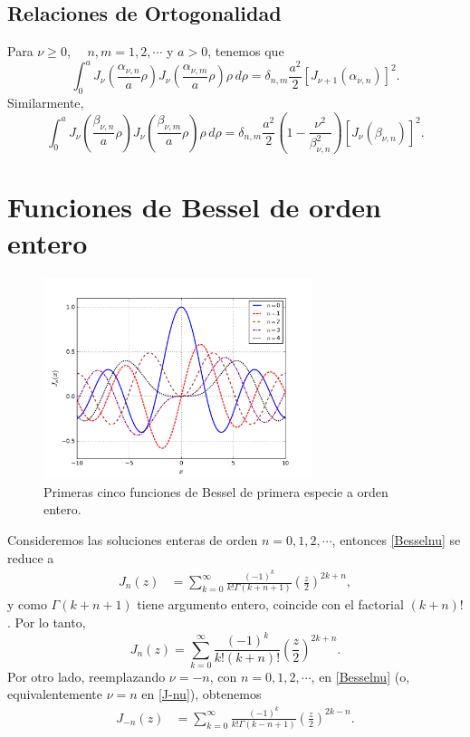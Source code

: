 \subsection{Relaciones de Ortogonalidad}
Para $\nu\ge 0$, $\quad n,m=1,2,\cdots$ y $a>0$, tenemos que
\begin{equation}\label{roJnualpha}
\int_0^a J_\nu\left(\frac{\alpha_{\nu,n}}{a}\rho\right)J_\nu\left(\frac{\alpha_{\nu,m}}{a}\rho\right)\rho \, d\rho=\delta_{n,m}\frac{a^2}{2}\left[J_{\nu+1}(\alpha_{\nu,n})\right]^2.
\end{equation}
Similarmente,
\begin{equation}\label{roJnubeta}
\int_0^a J_\nu\left(\frac{\beta_{\nu,n}}{a}\rho\right)J_\nu\left(\frac{\beta_{\nu,m}}{a}\rho\right)\rho \, d\rho=\delta_{n,m}\frac{a^2}{2}\left(1-\frac{\nu^2}{\beta_{\nu,n}^2}\right)\left[J_\nu(\beta_{\nu,n})\right]^2.
\end{equation}

\section{Funciones de Bessel de orden entero}
\begin{figure}[H]
\centering
\includegraphics[angle=0,width=0.7\textwidth]{figs/fig-Bessel-J.pdf}
\caption{Primeras cinco funciones de Bessel de primera especie a orden entero.}
\label{fig-Jn}
\end{figure}
Consideremos las soluciones enteras de orden $n=0,1,2,\cdots$, entonces \eqref{Besselnu} se reduce a
\begin{align}
J_n(z) &= \sum_{k=0}^\infty \frac{(-1)^k}{k!\Gamma(k+n+ 1)}
\left(\frac{z}{2}\right)^{2k+n},
\end{align}
y como $\Gamma(k+n+ 1)$ tiene argumento entero, coincide con el factorial $(k+n)!$. Por lo tanto,
\begin{equation}
\boxed{J_n(z) =\sum_{k=0}^\infty \frac{(-1)^k}{k!(k+n)!}
\left(\frac{z}{2}\right)^{2k+n}.}
\end{equation}
Por otro lado, reemplazando $\nu=-n$, con $n=0,1,2,\cdots$, en \eqref{Besselnu} (o, equivalentemente $\nu=n$ en \eqref{J-nu}), obtenemos
\begin{align}\label{J-n}
J_{-n}(z) &= \sum_{k=0}^\infty \frac{(-1)^k}{k!\Gamma(k-n+ 1) }
\left(\frac{z}{2}\right)^{2k-n}.
\end{align}

